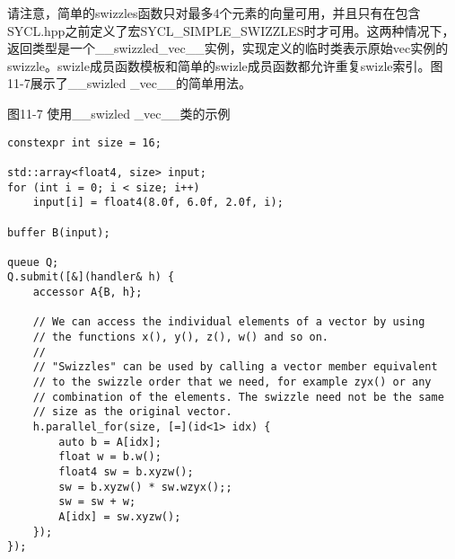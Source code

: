 请注意，简单的swizzles函数只对最多4个元素的向量可用，并且只有在包含SYCL.hpp之前定义了宏SYCL\_SIMPLE\_SWIZZLES时才可用。这两种情况下，返回类型是一个\_\_swizzled\_vec\_\_实例，实现定义的临时类表示原始vec实例的swizzle。swizle成员函数模板和简单的swizle成员函数都允许重复swizle索引。图11-7展示了\_\_swizled \_vec\_\_的简单用法。\par

\hspace*{\fill} \par %
图11-7 使用\_\_swizled \_vec\_\_类的示例
\begin{lstlisting}[caption={}]
constexpr int size = 16;

std::array<float4, size> input;
for (int i = 0; i < size; i++)
	input[i] = float4(8.0f, 6.0f, 2.0f, i);

buffer B(input);

queue Q;
Q.submit([&](handler& h) {
	accessor A{B, h};
	
	// We can access the individual elements of a vector by using 
	// the functions x(), y(), z(), w() and so on.
	//
	// "Swizzles" can be used by calling a vector member equivalent
	// to the swizzle order that we need, for example zyx() or any
	// combination of the elements. The swizzle need not be the same
	// size as the original vector.
	h.parallel_for(size, [=](id<1> idx) {
		auto b = A[idx];
		float w = b.w();
		float4 sw = b.xyzw();
		sw = b.xyzw() * sw.wzyx();;
		sw = sw + w;
		A[idx] = sw.xyzw();
	});
});
\end{lstlisting}
































